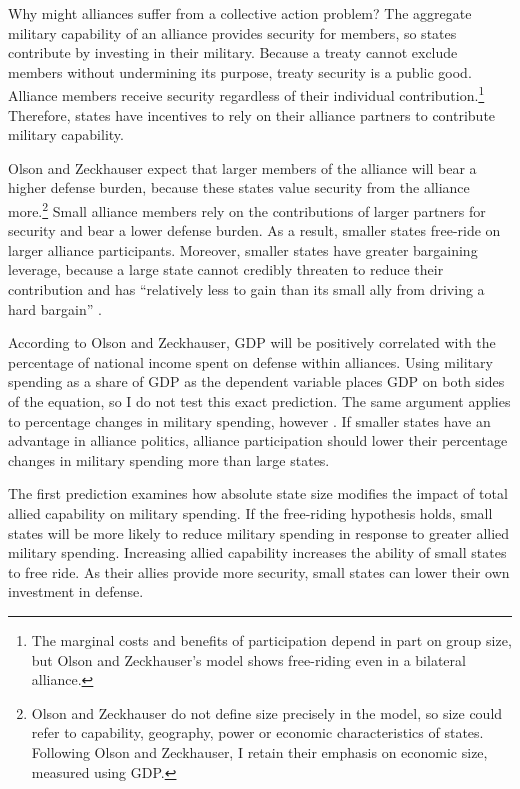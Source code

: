 \documentclass[12pt]{article}
\begin{document}
Why might alliances suffer from a collective action problem?
The aggregate military capability of an alliance provides security for members, so states contribute by investing in their military.
Because a treaty cannot exclude members without undermining its purpose, treaty security is a public good. 
Alliance members receive security regardless of their individual contribution.\footnote{The marginal costs and benefits of participation depend in part on group size, but Olson and Zeckhauser's model shows free-riding even in a bilateral alliance.}
Therefore, states have incentives to rely on their alliance partners to contribute military capability. 

 
Olson and Zeckhauser expect that larger members of the alliance will bear a higher defense burden, because these states value security from the alliance more.\footnote{Olson and Zeckhauser do not define size precisely in the model, so size could refer to capability, geography, power or economic characteristics of states. Following Olson and Zeckhauser, I retain their emphasis on economic size, measured using GDP.}
Small alliance members rely on the contributions of larger partners for security and bear a lower defense burden.
As a result, smaller states free-ride on larger alliance participants. 
Moreover, smaller states have greater bargaining leverage, because a large state cannot credibly threaten to reduce their contribution and has ``relatively less to gain than its small ally from driving a hard bargain'' \citep[pg. 274]{OlsonZeckhauser1966}. 


According to Olson and Zeckhauser, GDP will be positively correlated with the percentage of national income spent on defense within alliances.
Using military spending as a share of GDP as the dependent variable places GDP on both sides of the equation, so I do not test this exact prediction. 
The same argument applies to percentage changes in military spending, however \citep{PluemperNeumayer2015}. 
If smaller states have an advantage in alliance politics, alliance participation should lower their percentage changes in military spending more than large states. 


The first prediction examines how absolute state size modifies the impact of total allied capability on military spending. 
If the free-riding hypothesis holds, small states will be more likely to reduce military spending in response to greater allied military spending.  
Increasing allied capability increases the ability of small states to free ride. 
As their allies provide more security, small states can lower their own investment in defense. 
\end{document}
